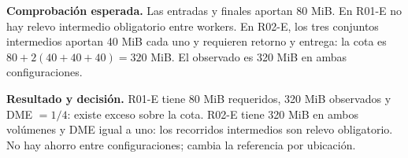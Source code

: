 \textbf{Comprobación esperada.} Las entradas y finales aportan 80 MiB. En R01-E no hay relevo intermedio obligatorio entre workers. En R02-E, los tres conjuntos intermedios aportan 40 MiB cada uno y requieren retorno y entrega: la cota es $80+2(40+40+40)=320$ MiB. El observado es 320 MiB en ambas configuraciones.

\textbf{Resultado y decisión.} R01-E tiene 80 MiB requeridos, 320 MiB observados y DME $=1/4$: existe exceso sobre la cota. R02-E tiene 320 MiB en ambos volúmenes y DME igual a uno: los recorridos intermedios son relevo obligatorio. No hay ahorro entre configuraciones; cambia la referencia por ubicación.

